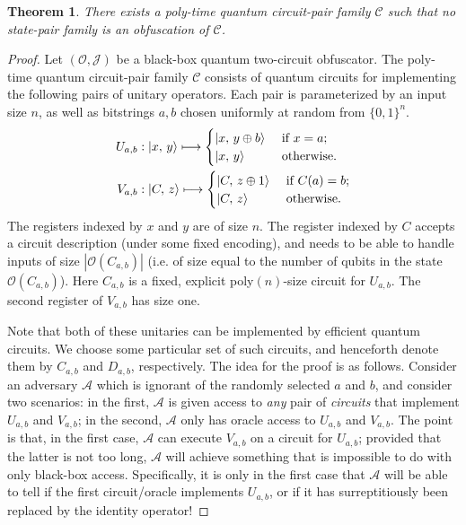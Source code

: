 \documentclass[11pt]{article}
\numberwithin{equation}{section}
\newtheorem{theorem}{Theorem}
\newcommand{\algo}{\mathcal}
\begin{document}
{\begin{theorem}\label{thm:pair-impossibility}
There exists a poly-time quantum circuit-pair family $\mathcal C$ such that no state-pair family is an obfuscation of $\mathcal C$.
\end{theorem}
\begin{proof}
Let $(\mathcal O, \mathcal J)$ be a black-box quantum two-circuit obfuscator. 
The poly-time quantum circuit-pair family $\mathcal C$ consists of quantum circuits for implementing the following pairs of unitary operators. Each pair is parameterized by an input size $n$, as well as bitstrings $a, b$ chosen uniformly at random from $\{0, 1\}^n$.
\begin{align}\label{eq:pair-impossible}
U_{a, b} &: {\left\vert{x,\, y}\right\rangle} \longmapsto
\begin{cases}
{\left\vert{x,\, y \oplus b}\right\rangle} &\text{ if } x = a;\\
{\left\vert{x,\, y}\right\rangle} &\text{ otherwise}.
\end{cases}\\
V_{a, b} &: {\left\vert{C,\, z}\right\rangle} \longmapsto
\begin{cases}
{\left\vert{C,\, z \oplus 1}\right\rangle} &\text{ if } C(a) = b;\\
{\left\vert{C,\, z}\right\rangle} &\text{ otherwise}.
\end{cases}
\end{align}
The registers indexed by $x$ and $y$ are of size $n$. The register indexed by $C$ accepts a circuit description (under some fixed encoding), and needs to be able to handle inputs of size $|\algo O(C_{a, b})|$ (i.e. of size equal to the number of qubits in the state $\algo O(C_{a, b})$). Here $C_{a, b}$ is a fixed, explicit poly$(n)$-size circuit for $U_{a, b}$. The second register of $V_{a, b}$ has size one. 

Note that both of these unitaries can be implemented by efficient quantum circuits. We choose some particular set of such circuits, and henceforth denote them by $C_{a,b}$ and $D_{a,b}$, respectively. The idea for the proof is as follows. Consider an adversary $\algo A$ which is ignorant of the randomly selected $a$ and $b$, and consider two scenarios: in the first, $\algo A$ is given access to \emph{any} pair of \emph{circuits} that implement $U_{a, b}$ and $V_{a, b}$; in the second, $\algo A$ only has oracle access to $U_{a, b}$ and $V_{a, b}$. The point is that, in the first case, $\algo A$ can execute $V_{a, b}$ on a circuit for $U_{a, b}$; provided that the latter is not too long, $\algo A$ will achieve something that is impossible to do with only black-box access. Specifically, it is only in the first case that $\algo A$ will be able to tell if the first circuit/oracle implements $U_{a, b}$, or if it has surreptitiously been replaced by the identity operator!


\end{proof}}
\end{document}
